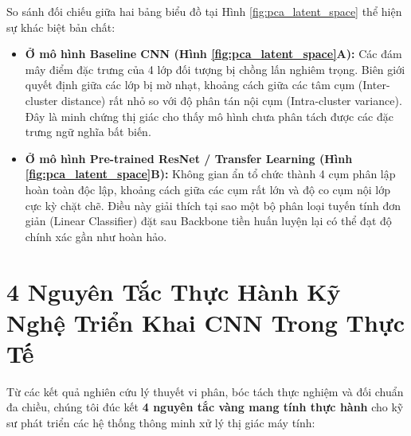 \documentclass[12pt,a4paper]{report}
\begin{document}
So sánh đối chiếu giữa hai bảng biểu đồ tại Hình \ref{fig:pca_latent_space} thể hiện sự khác biệt bản chất:
\begin{itemize}[leftmargin=*]
    \item \textbf{Ở mô hình Baseline CNN (Hình \ref{fig:pca_latent_space}A):} Các đám mây điểm đặc trưng của 4 lớp đối tượng bị chồng lấn nghiêm trọng. Biên giới quyết định giữa các lớp bị mờ nhạt, khoảng cách giữa các tâm cụm (Inter-cluster distance) rất nhỏ so với độ phân tán nội cụm (Intra-cluster variance). Đây là minh chứng thị giác cho thấy mô hình chưa phân tách được các đặc trưng ngữ nghĩa bất biến.
    \item \textbf{Ở mô hình Pre-trained ResNet / Transfer Learning (Hình \ref{fig:pca_latent_space}B):} Không gian ẩn tổ chức thành 4 cụm phân lập hoàn toàn độc lập, khoảng cách giữa các cụm rất lớn và độ co cụm nội lớp cực kỳ chặt chẽ. Điều này giải thích tại sao một bộ phân loại tuyến tính đơn giản (Linear Classifier) đặt sau Backbone tiền huấn luyện lại có thể đạt độ chính xác gần như hoàn hảo.
\end{itemize}

\section{4 Nguyên Tắc Thực Hành Kỹ Nghệ Triển Khai CNN Trong Thực Tế}
Từ các kết quả nghiên cứu lý thuyết vi phân, bóc tách thực nghiệm và đối chuẩn đa chiều, chúng tôi đúc kết \textbf{4 nguyên tắc vàng mang tính thực hành} cho kỹ sư phát triển các hệ thống thông minh xử lý thị giác máy tính:
\end{document}

